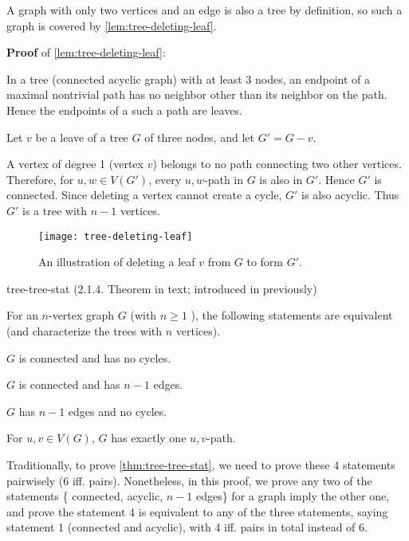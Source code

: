 \documentclass[../src/handouts/main.tex]{subfiles}
\begin{document}
A graph with only two vertices and an edge is also a tree by definition, so such a graph is covered by \cref{lem:tree-deleting-leaf}.

\textbf{Proof} of \cref{lem:tree-deleting-leaf}:
\begin{enumerate*}
  \item {}
  \item In a tree (connected acyclic graph) with at least 3 nodes, an endpoint of a maximal nontrivial path has no neighbor other than its neighbor on the path. Hence the endpoints of a such a path are leaves.
  \item Let $v$ be a leave of a tree $G$ of three nodes, and let $G' = G - v$.
  \item A vertex of degree 1 (vertex $v$) belongs to no path connecting two other vertices. Therefore, for $u, w \in V\left( G' \right)$, every $u,w$-path in $G$ is also in $G'$. Hence $G'$ is connected. Since deleting a vertex cannot create a cycle, $G'$ is also acyclic. Thus $G'$ is a tree with $n - 1$ vertices.
\end{enumerate*}

\begin{figure}[htbp]
  \centering
  \texttt{[image: tree-deleting-leaf]}
  \caption{An illustration of deleting a leaf $v$ from $G$ to form $G'$.}
  \label{fig:tree-deleting-leaf}
\end{figure}

\begin{theorem}{}{tree-tree-stat}
  (2.1.4. Theorem in text; introduced in  previously)

  For an $n$-vertex graph $G$ (with $n \geq 1$ ), the following statements are equivalent (and characterize the trees with $n$ vertices).
  \begin{enumerate*}
    \item $G$ is connected and has no cycles.
    \item $G$ is connected and has $n - 1$ edges.
    \item $G$ has $n - 1$ edges and no cycles.
    \item For $u, v \in V(G)$, $G$ has exactly one $u,v$-path.
  \end{enumerate*}
\end{theorem}

Traditionally, to prove \cref{thm:tree-tree-stat}, we need to prove these 4 statements pairwisely (6 iff. pairs). Nonetheless, in this proof, we prove any two of the statements \{ connected, acyclic, $n - 1$ edges\} for a graph imply the other one, and prove the statement 4 is equivalent to any of the three statements, saying statement 1 (connected and acyclic), with 4 iff. pairs in total instead of 6.
\end{document}
